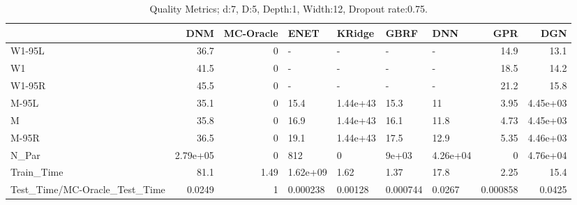 \begin{table}
\centering
\caption{Quality Metrics; d:7, D:5, Depth:1, Width:12, Dropout rate:0.75.}
\begin{tabular}{lrrllllrr}
\toprule
{} &      DNM &  MC-Oracle &     ENET &   KRidge &     GBRF &      DNN &      GPR &      DGN \\
\midrule
W1-95L                        &     36.7 &          0 &        - &        - &        - &        - &     14.9 &     13.1 \\
W1                            &     41.5 &          0 &        - &        - &        - &        - &     18.5 &     14.2 \\
W1-95R                        &     45.5 &          0 &        - &        - &        - &        - &     21.2 &     15.8 \\
M-95L                         &     35.1 &          0 &     15.4 & 1.44e+43 &     15.3 &       11 &     3.95 & 4.45e+03 \\
M                             &     35.8 &          0 &     16.9 & 1.44e+43 &     16.1 &     11.8 &     4.73 & 4.45e+03 \\
M-95R                         &     36.5 &          0 &     19.1 & 1.44e+43 &     17.5 &     12.9 &     5.35 & 4.46e+03 \\
N\_Par                         & 2.79e+05 &          0 &      812 &        0 &    9e+03 & 4.26e+04 &        0 & 4.76e+04 \\
Train\_Time                    &     81.1 &       1.49 & 1.62e+09 &     1.62 &     1.37 &     17.8 &     2.25 &     15.4 \\
Test\_Time/MC-Oracle\_Test\_Time &   0.0249 &          1 & 0.000238 &  0.00128 & 0.000744 &   0.0267 & 0.000858 &   0.0425 \\
\bottomrule
\end{tabular}
\end{table}
